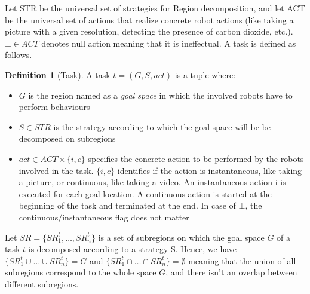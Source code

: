 \documentclass[journal]{IEEEtran}
\theoremstyle{definition}
\newtheorem{definition}{Definition}
\newcommand\ivano[1]{\nb{Ivano}{#1}}
\begin{document}
Let STR be the universal set of strategies for Region decomposition, and let ACT be the universal set of actions that realize concrete robot actions
(like taking a picture with a given resolution, detecting the
presence of carbon dioxide, etc.). $\bot \in ACT$ denotes null action meaning that it is ineffectual. A task is defined as follows.

\begin{definition}[Task] 
A task $t=(G,S,act)$ is a tuple where:
\begin{itemize}
\item $G$ is the region named as a \textit{goal space} in which the involved robots have to perform behaviours 
\item $S \in STR$ is the strategy according to which the goal space will be be  decomposed on subregions 
\item  $act \in ACT \times \{i, c\}$ specifies the concrete action to be performed by the robots involved in the task. $\{i, c\}$ identifies if the action
is instantaneous, like taking a picture, or continuous, like taking a
video. An instantaneous action i is executed for each goal location. A continuous action is started at the beginning of the task and terminated at the end. In case of $\bot$, the continuous/instantaneous flag
does not matter
\end{itemize}
\end{definition}

Let $SR = \{SR^t_1, \dots, SR^t_n \}$ is a set of subregions on which the goal space $G$ of a task $t$ is decomposed according to a strategy S. 
Hence, we have $\{SR^t_1 \cup \dots \cup SR^t_n\} = G$ and 
$ \{SR^t_1 \cap \dots \cap SR^t_n\} = \emptyset$ meaning that the union of all subregions correspond to the whole space $G$, and there isn't an overlap between different subregions.

\end{document}
